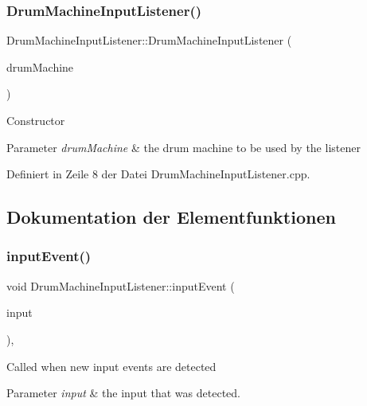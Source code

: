 \subsubsection{\texorpdfstring{Drum\+Machine\+Input\+Listener()}{DrumMachineInputListener()}}
{\footnotesize\ttfamily Drum\+Machine\+Input\+Listener\+::\+Drum\+Machine\+Input\+Listener (\begin{DoxyParamCaption}\item[{\hyperlink{class_drum_machine}{Drum\+Machine} \&}]{drum\+Machine }\end{DoxyParamCaption})\hspace{0.3cm}{\ttfamily [explicit]}}

Constructor 
\begin{DoxyParams}{Parameter}
{\em drum\+Machine} & the drum machine to be used by the listener \\
\hline
\end{DoxyParams}


Definiert in Zeile 8 der Datei Drum\+Machine\+Input\+Listener.\+cpp.



\subsection{Dokumentation der Elementfunktionen}
\mbox{\label{class_drum_machine_input_listener_a44a620b09b35885a26befe84fa6e1ab0}} 
\subsubsection{\texorpdfstring{input\+Event()}{inputEvent()}}
{\footnotesize\ttfamily void Drum\+Machine\+Input\+Listener\+::input\+Event (\begin{DoxyParamCaption}\item[{unsigned short}]{input }\end{DoxyParamCaption})\hspace{0.3cm}{\ttfamily [override]}, {\ttfamily [virtual]}}

Called when new input events are detected 
\begin{DoxyParams}{Parameter}
{\em input} & the input that was detected. \\
\hline
\end{DoxyParams}


